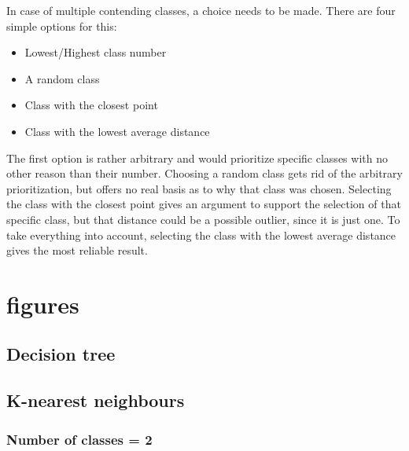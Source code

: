 \documentclass[10pt,a4paper]{article}
\begin{document}
In case of multiple contending classes, a choice needs to be made. There are four simple options for this:
\begin{itemize}
\item Lowest/Highest class number
\item A random class
\item Class with the closest point
\item Class with the lowest average distance
\end{itemize}

The first option is rather arbitrary and would prioritize specific classes with no other reason than their number. Choosing a random class gets rid of the arbitrary prioritization, but offers no real basis as to why that class was chosen.
Selecting the class with the closest point gives an argument to support the selection of that specific class, but that distance could be a possible outlier, since it is just one. To take everything into account, selecting the class with the lowest average distance gives the most reliable result.

\appendix
\section{figures}

\subsection{Decision tree}
\subsection{K-nearest neighbours}\label{ap:knn_img}
\subsubsection{Number of classes = 2}
\end{document}
